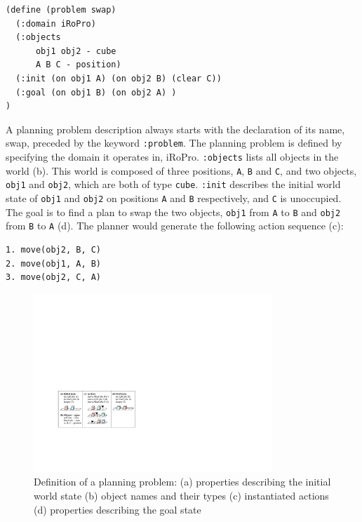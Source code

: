 \begin{verbatim}
(define (problem swap)
  (:domain iRoPro)
  (:objects 
      obj1 obj2 - cube
      A B C - position)
  (:init (on obj1 A) (on obj2 B) (clear C))
  (:goal (on obj1 B) (on obj2 A) )
)
\end{verbatim}

A planning problem description always starts with the declaration of its name, \eg swap, preceded by the keyword \texttt{:problem}.
The planning problem is defined by specifying the domain it operates in, \eg iRoPro.
\texttt{:objects} lists all objects in the world (b). 
This world is composed of three positions, \texttt{A}, \texttt{B} and \texttt{C}, and two objects, \texttt{obj1} and \texttt{obj2}, which are both of type \texttt{cube}. 
\texttt{:init} describes the initial world state of \texttt{obj1} and \texttt{obj2} on positions \texttt{A} and \texttt{B} respectively, and \texttt{C} is unoccupied.
The goal is to find a plan to swap the two objects, \ie \texttt{obj1} from \texttt{A} to \texttt{B} and \texttt{obj2} from \texttt{B} to \texttt{A} (d). 
The planner would generate the following action sequence (c):
\begin{verbatim}
1. move(obj2, B, C)
2. move(obj1, A, B)
3. move(obj2, C, A)
\end{verbatim}

\begin{figure}[h]
	\centering
	\includegraphics[width=0.8\textwidth]{figures/planning-permutation}
	\caption{Definition of a planning problem: (a) properties describing the initial world state (b) object names and their types (c) instantiated actions (d) properties describing the goal state}
	\label{fig:planning problem}
\end{figure}

